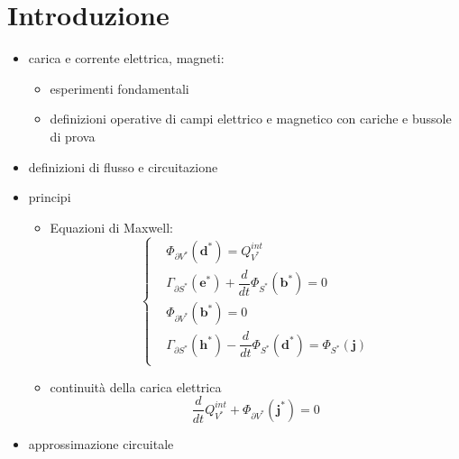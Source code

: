 

\chapter{Introduzione}

\begin{itemize}
  \item carica e corrente elettrica, magneti:
  \begin{itemize}
    \item esperimenti fondamentali
    \item definizioni operative di campi elettrico e magnetico con cariche e bussole di prova
  \end{itemize}
  \item definizioni di flusso e circuitazione
  \item principi
    \begin{itemize}
        \item Equazioni di Maxwell:
            \begin{equation}
                \begin{cases}
                    &  \Phi_{\partial V^*}(\mathbf{d}^*) = Q_{V^*}^{int} \\
                    &  \Gamma_{\partial S^*}(\mathbf{e}^*) + \dfrac{d}{dt}\Phi_{S^*}(\mathbf{b}^*) = 0 \\
                    &  \Phi_{\partial V^*}(\mathbf{b}^*) = 0 \\
                    &  \Gamma_{\partial S^*}(\mathbf{h}^*) - \dfrac{d}{dt}\Phi_{S^*}(\mathbf{d}^*) = \Phi_{S^*}(\mathbf{j}) \\
                \end{cases}
            \end{equation}
        \item continuità della carica elettrica
            \begin{equation}
                \dfrac{d}{dt} Q_{V^*}^{int} + \Phi_{\partial V^*}(\mathbf{j}^*) = 0
            \end{equation}
    \end{itemize}
  \item approssimazione circuitale
\end{itemize}

% 
